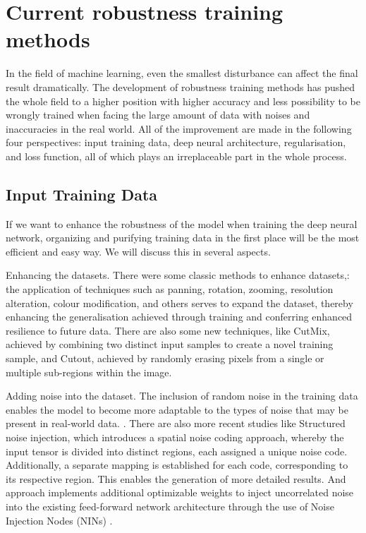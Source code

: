 \documentclass{article}
\begin{document}
\section{Current robustness training methods}

In the field of machine learning, even the smallest disturbance can affect the final result dramatically. The development of robustness training methods has pushed the whole field to a higher position with higher accuracy and less possibility to be wrongly trained when facing the large amount of data with noises and inaccuracies in the real world. All of the improvement are made in the following four perspectives: input training data, deep neural architecture, regularisation, and loss function, all of which plays an irreplaceable part in the whole process.

\subsection{Input Training Data}

If we want to enhance the robustness of the model when training the deep neural network, organizing and purifying training data in the first place will be the most efficient and easy way. We will discuss this in several aspects.

Enhancing the datasets. There were some classic methods to enhance datasets,: the application of techniques such as panning, rotation, zooming, resolution alteration, colour modification, and others serves to expand the dataset, thereby enhancing the generalisation achieved through training and conferring enhanced resilience to future data. There are also some new techniques, like CutMix\cite{yun2019cutmixregularizationstrategytrain}, achieved by combining two distinct input samples to create a novel training sample, and Cutout\cite{devries2017improvedregularizationconvolutionalneural}, achieved by randomly erasing pixels from a single or multiple sub-regions within the image.

Adding noise into the dataset. The inclusion of random noise in the training data enables the model to become more adaptable to the types of noise that may be present in real-world data\cite{6889193}. \cite{rakin2018parametricnoiseinjectiontrainable}. There are also more recent studies like Structured noise injection\cite{alharbi2020disentangledimagegenerationstructured}, which introduces a spatial noise coding approach, whereby the input tensor is divided into distinct regions, each assigned a unique noise code. Additionally, a separate mapping is established for each code, corresponding to its respective region. This enables the generation of more detailed results. And approach implements additional optimizable weights to inject uncorrelated noise into the existing feed-forward network architecture through the use of Noise Injection Nodes (NINs) \cite{levi2022noiseinjectionprobedeep}. 
\end{document}
